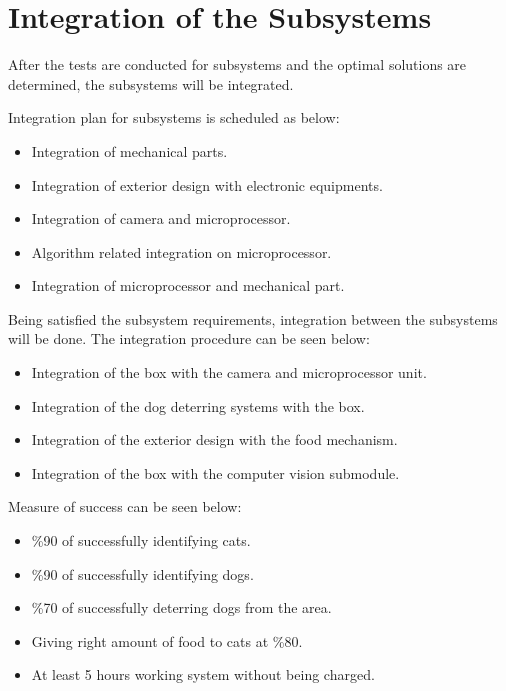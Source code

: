 \section{Integration of the Subsystems} \label{sec:integration}

After the tests are conducted for subsystems and the optimal solutions are determined, the subsystems will be integrated. 

Integration plan for subsystems is scheduled as below:
\begin{itemize}
\item Integration of mechanical parts.
\item Integration of exterior design with electronic equipments.
\item Integration of camera and microprocessor.
\item Algorithm related integration on microprocessor.
\item Integration of microprocessor and mechanical part.
\end{itemize}

Being satisfied the subsystem requirements, integration between the subsystems will be done. The integration procedure can be seen below:
\begin{itemize}
    \item Integration of the box with the camera and microprocessor unit.
    \item Integration of the dog deterring systems with the box.
    \item Integration of the exterior design with the food mechanism.
    \item Integration of the box with the computer vision submodule.
\end{itemize}

Measure of success can be seen below:
\begin{itemize}
    \item \%90 of successfully identifying cats.
    \item \%90 of successfully identifying dogs.
    \item \%70 of successfully deterring dogs from the area.
    \item Giving right amount of food to cats at \%80.
    \item At least 5 hours working system without being charged.
\end{itemize}


